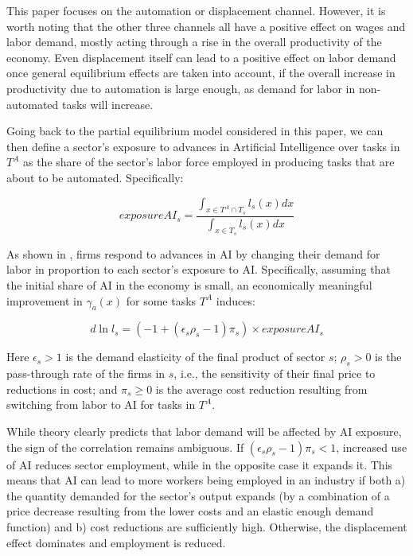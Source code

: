 \documentclass[11pt]{article}
\begin{document}
This paper focuses on the automation or displacement channel. However, it is worth noting that the other three channels all have a positive effect on wages and labor demand, mostly acting through a rise in the overall productivity of the economy. Even displacement itself can lead to a positive effect on labor demand once general equilibrium effects are taken into account, if the overall increase in productivity due to automation is large enough, as demand for labor in non-automated tasks will increase.

Going back to the partial equilibrium model considered in this paper, we can then define a sector's exposure to advances in Artificial Intelligence over tasks in $T^A$ as the share of the sector's labor force employed in producing tasks that are about to be automated. Specifically:

\begin{equation}
exposureAI_s = \frac{\int_{x \in T^A \cap T_s}l_s(x)dx}{\int_{x \in T_s} l_s(x) dx}
\label{eq:exposuredef}
\end{equation}

As shown in \citet{acemoglu_restrepo_2022}, firms respond to advances in AI by changing their demand for labor in proportion to each sector's exposure to AI. Specifically, assuming that the initial share of AI in the economy is small, an economically meaningful improvement in $\gamma_a(x)$ for some tasks $T^A$ induces:

\begin{equation}
d\ln{l_s} = (-1 + (\epsilon_s\rho_s-1)\pi_s)\times exposureAI_s
\label{eq:lvsexposure}
\end{equation}

Here $\epsilon_s > 1$ is the demand elasticity of the final product of sector $s$; $\rho_s > 0$ is the pass-through rate of the firms in $s$, i.e., the sensitivity of their final price to reductions in cost; and $\pi_s \ge 0$ is the average cost reduction resulting from switching from labor to AI for tasks in $T^A$.

While theory clearly predicts that labor demand will be affected by AI exposure, the sign of the correlation remains ambiguous. If $(\epsilon_s\rho_s-1)\pi_s < 1$, increased use of AI reduces sector employment, while in the opposite case it expands it. This means that AI can lead to more workers being employed in an industry if both a) the quantity demanded for the sector's output expands (by a combination of a price decrease resulting from the lower costs and an elastic enough demand function) and b) cost reductions are sufficiently high. Otherwise, the displacement effect dominates and employment is reduced.
\end{document}
